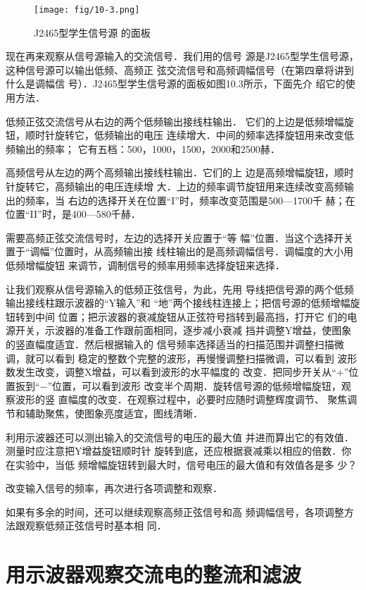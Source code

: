     \begin{figure}[htp]\centering
        \texttt{[image: fig/10-3.png]}
        \caption{J2465型学生信号源
        的面板}
        \end{figure}

现在再来观察从信号源输入的交流信号．我们用的信号
源是J2465型学生信号源，这种信号源可以输出低频、高频正
弦交流信号和高频调幅信号（在第四章将讲到什么是调幅信
号）．J2465型学生信号源的面板如图10.3所示，下面先介
绍它的使用方法．

低频正弦交流信号从右边的两个低频输出接线柱输出．
它们的上边是低频增幅旋钮，顺时针旋转它，低频输出的电压
连续增大．中间的频率选择旋钮用来改变低频输出的频率；
它有五档：500，1000，1500，2000和2500赫．

高频信号从左边的两个高频输出接线柱输出．它们的上
边是高频增幅旋钮，顺时针旋转它，高频输出的电压连续增
大．上边的频率调节旋钮用来连续改变高频输出的频率，当
右边的选择开关在位置“I”时，频率改变范围是500—1700千
赫；在位置“II”时，是400—580千赫．

需要高频正弦交流信号时，左边的选择开关应置于“等
幅”位置．当这个选择开关置于“调幅”位置时，从高频输出接
线柱输出的是高频调幅信号．调幅度的大小用低频增幅旋钮
来调节，调制信号的频率用频率选择旋钮来选择．

让我们观察从信号源输入的低频正弦信号，为此，先用
导线把信号源的两个低频输出接线柱跟示波器的“Y输入”和
“地”两个接线柱连接上；把信号源的低频增幅旋钮转到中间
位置；把示波器的衰减旋钮从正弦符号挡转到最高挡，打开它
们的电源开关，示波器的准备工作跟前面相同，逐步减小衰减
挡并调整Y增益，使图象的竖直幅度适宜．然后根据输入的
信号频率选择适当的扫描范围并调整扫描微调，就可以看到
稳定的整数个完整的波形，再慢慢调整扫描微调，可以看到
波形数发生改变，调整X增益，可以看到波形的水平幅度的
改变．把同步开关从“$+$”位置扳到“$-$”位置，可以看到波形
改变半个周期．旋转信号源的低频增幅旋钮，观察波形的竖
直幅度的改变．在观察过程中，必要时应随时调整辉度调节、
聚焦调节和辅助聚焦，使图象亮度适宜，图线清晰．

利用示波器还可以测出输入的交流信号的电压的最大值
并进而算出它的有效值．测量时应注意把Y增益旋钮顺时针
旋转到底，还应根据衰减乘以相应的倍数．你在实验中，当低
频增幅旋钮转到最大时，信号电压的最大值和有效值各是多
少？

改变输入信号的频率，再次进行各项调整和观察．

如果有多余的时间，还可以继续观察高频正弦信号和高
频调幅信号，各项调整方法跟观察低频正弦信号时基本相
同．

\section{用示波器观察交流电的整流和滤波}

